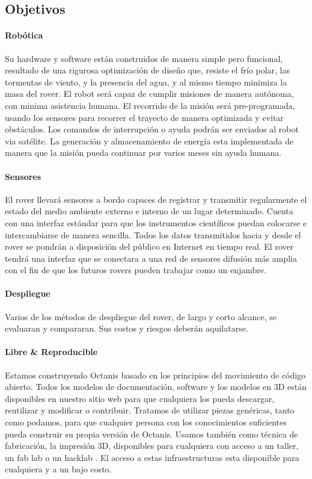 \documentclass[a4paper,12pt]{article}
\begin{document}
\subsection{Objetivos}

\paragraph{Robótica}
Su hardware y software están construidos de manera simple pero funcional, resultado de una rigurosa optimización de diseño que, resiste el frío polar, las tormentas de viento,  y la presencia del agua, y al mismo tiempo minimiza la masa del rover. El robot será capaz de cumplir misiones de manera autónoma, con minima asistencia humana. El recorrido de la misión será pre-programada, usando los sensores para recorrer el trayecto de manera optimizada y evitar obstáculos. Los comandos de interrupción o ayuda podrán ser enviados al robot via satélite. La generación y almacenamiento de energía esta implementada de manera que la misión pueda continuar por varios meses sin ayuda humana. 

\paragraph{Sensores}
El rover llevará sensores a bordo capaces de registrar y transmitir regularmente el estado del medio ambiente externo e interno de un lugar determinado. Cuenta con una interfaz estándar para que los instrumentos científicos puedan colocarse e intercambiarse de manera sencilla. Todos los datos transmitidos hacia y desde el rover se pondrán a disposición del público en Internet en tiempo real. El rover tendrá una interfaz que se conectara a una red de sensores difusión más amplia con el fin de que los futuros rovers pueden trabajar como un enjambre.

\paragraph{Despliegue}
Varios de los métodos de despliegue del rover, de largo y corto alcance, se evaluaran y compararan. Sus costos y riesgos deberán aquilatarse.


\paragraph{Libre \& Reproducible} 
Estamos construyendo Octanis basado en los principios del movimiento de código abierto. Todos los modelos de documentación, software y los modelos en 3D están disponibles en nuestro sitio web para que cualquiera los pueda descargar, reutilizar y modificar o contribuir. Tratamos de utilizar piezas genéricas, tanto como podamos, para que cualquier persona con los conocimientos suficientes pueda construir su propia versión de Octanis. Usamos también como técnica de fabricación, la impresión 3D, disponibles para cualquiera con acceso a un taller, un fab lab \cite{fablab} o un hacklab \cite{hackerspace}. El acceso a estas infraestructuras esta disponible para cualquiera y a un bajo costo.
 
\end{document}
